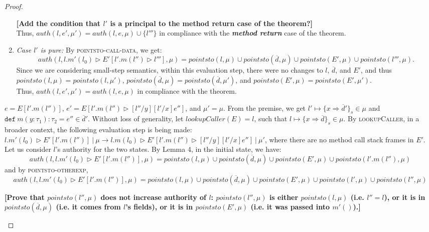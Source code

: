 \documentclass{llncs}
\newcommand{\keywadj}[1]{\mathtt{#1}}
\newcommand{\keyw}[1]{\keywadj{#1}~}
\newcommand{\todo}[1]{\textbf{[#1]}}
\newcommand{\pcase}[1][]{
  \if\relax\detokenize{#1}\relax
    \def\thiscase{}
  \else
    \def\thiscase{~#1}
  \fi
  \item
}
\begin{document}
\begin{proof}
\begin{pcases}
\begin{enumerate}
\todo{Add the condition that $l'$ is a principal to the method return case of the theorem?}\\

Thus, $auth(l, e', \mu') = auth(l, e, \mu) \cup \{ l''' \}$ in compliance with the \textbf{\textit{method return}} case of the theorem.
\\

\item[] \textit{Case $l'$ is pure:} By \textsc{pointsto-call-data}, we get:
\[
auth(l, l.m'(l_0) \rhd E'[l'.m(l'') \rhd l'''], \mu) = pointsto(l, \mu) \cup pointsto(\overline{d}, \mu) \cup pointsto(E', \mu) \cup pointsto(l''', \mu).
\]
Since we are considering small-step semantics, within this evaluation step, there were no changes to $l$, $\overline{d}$, and $E'$, and thus $pointsto(l, \mu) = pointsto(l, \mu')$, $pointsto(\overline{d}, \mu) = pointsto(\overline{d}, \mu')$, and $pointsto(E', \mu) = pointsto(E', \mu')$.\\

Thus, $auth(l, e', \mu') = auth(l, e, \mu)$ in compliance with the theorem.
\\
\end{enumerate}

\pcase[\textsc{E-Meth}]
$e = E[l'.m(l'')]$, $e' = E[l'.m(l'') \rhd [l''/y] [l'/x] e'']$, and $\mu' = \mu$. From the premise, we get $l' \mapsto \{ x \Rightarrow \overline{d}' \}_{s} \in \mu$ and $\keyw{def} m(y : \tau_1) : \tau_2 = e'' \in \overline{d}'$. Without loss of generality, let $lookupCaller(E) = l$, such that $l \mapsto \{ x \Rightarrow \overline{d} \}_{s} \in \mu$. By \textsc{lookupCaller}, in a broader context, the following evaluation step is being made: \mbox{$l.m'(l_0) \rhd E'[l'.m(l'')]~|~\mu \longrightarrow l.m(l_0) \rhd E'[l'.m(l'') \rhd [l''/y] [l'/x] e'']~|~\mu'$}, where there are no method call stack frames in $E'$.\\

Let us consider $l$'s authority for the two states. By Lemma 4, in the initial state, we have:
\[
auth(l, l.m'(l_0) \rhd E'[l'.m(l'')], \mu) = pointsto(l, \mu) \cup pointsto(\overline{d}, \mu) \cup pointsto(E', \mu) \cup pointsto(l'.m(l''), \mu)\]
and by \textsc{pointsto-otherexp},
\[
auth(l, l.m'(l_0) \rhd E'[l'.m(l'')], \mu) = pointsto(l, \mu) \cup pointsto(\overline{d}, \mu) \cup pointsto(E', \mu) \cup pointsto(l', \mu) \cup pointsto(l'', \mu)
\]

\todo{Prove that $pointsto(l'', \mu)$ does not increase authority of $l$: $pointsto(l'', \mu)$ is either $pointsto(l, \mu)$ (i.e. $l'' = l$), or it is in $pointsto(\overline{d}, \mu)$ (i.e. it comes from $l$'s fields), or it is in $pointsto(E', \mu)$ (i.e. it was passed into $m'()$).}\\


\end{pcases}
\end{proof}
\end{document}
